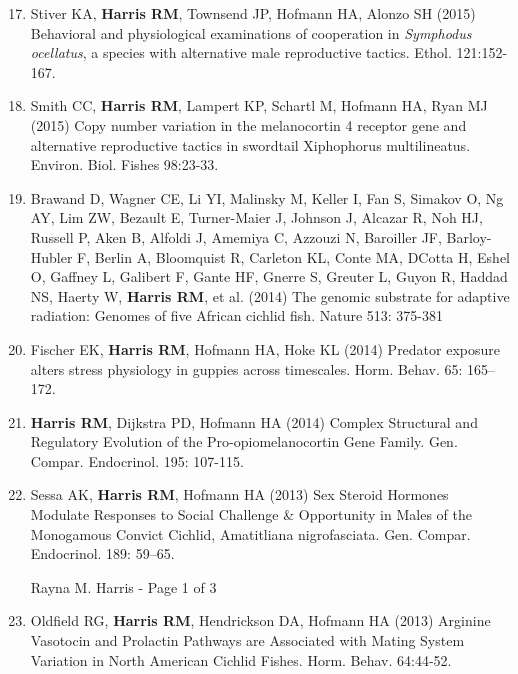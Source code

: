 \documentclass[margin,line]{resume}
\newenvironment{benumerate}[1]{
    \let\oldItem\item
    \def\item{\addtocounter{enumi}{-2}\oldItem}
    \begin{enumerate}
    \setcounter{enumi}{#1}
    \addtocounter{enumi}{1}
}{
    \end{enumerate}
}
\begin{document}
\begin{resume}
\begin{benumerate}{16}
\item Stiver KA, {\bf Harris RM}, Townsend JP, Hofmann HA, Alonzo SH (2015) Behavioral and physiological examinations of cooperation in {\it Symphodus ocellatus}, a species with alternative male reproductive tactics. Ethol. 121:152-167.

\item Smith CC, {\bf Harris RM}, Lampert KP, Schartl M, Hofmann HA, Ryan MJ (2015) Copy number variation in the melanocortin 4 receptor gene and alternative reproductive tactics in swordtail Xiphophorus multilineatus. Environ. Biol. Fishes 98:23-33.

\item Brawand D, Wagner CE, Li YI, Malinsky M, Keller I, Fan S, Simakov O, Ng AY, Lim ZW, Bezault E, Turner-Maier J, Johnson J, Alcazar R, Noh HJ, Russell P, Aken B, Alfoldi J, Amemiya C, Azzouzi N, Baroiller JF, Barloy-Hubler F, Berlin A, Bloomquist R, Carleton KL, Conte MA, D\textsc{}Cotta H, Eshel O, Gaffney L, Galibert F, Gante HF, Gnerre S, Greuter L, Guyon R, Haddad NS, Haerty W, {\bf Harris RM}, et al. (2014) The genomic substrate for adaptive radiation: Genomes of five African cichlid fish. Nature 513: 375-381

\item Fischer EK, {\bf Harris RM}, Hofmann HA, Hoke KL (2014) Predator exposure alters stress physiology in guppies across timescales. Horm. Behav. 65: 165–172. 

\item {\bf Harris RM}, Dijkstra PD, Hofmann HA (2014) Complex Structural and Regulatory Evolution of the Pro-opiomelanocortin Gene Family. Gen. Compar. Endocrinol. 195: 107-115. 

\item Sessa AK, {\bf Harris RM}, Hofmann HA (2013) Sex Steroid Hormones Modulate Responses to Social Challenge \& Opportunity in Males of the Monogamous Convict Cichlid, Amatitliana nigrofasciata. Gen. Compar. Endocrinol. 189: 59–65. 

\vspace{0.5 cm}
{\centerline {Rayna M. Harris - Page 1 of 3}}
\newpage

\item Oldfield RG, {\bf Harris RM}, Hendrickson DA, Hofmann HA (2013) Arginine Vasotocin and Prolactin Pathways are Associated with Mating System Variation in North American Cichlid Fishes. Horm. Behav. 64:44-52. 
\end{benumerate}



\end{resume}
\end{document}
